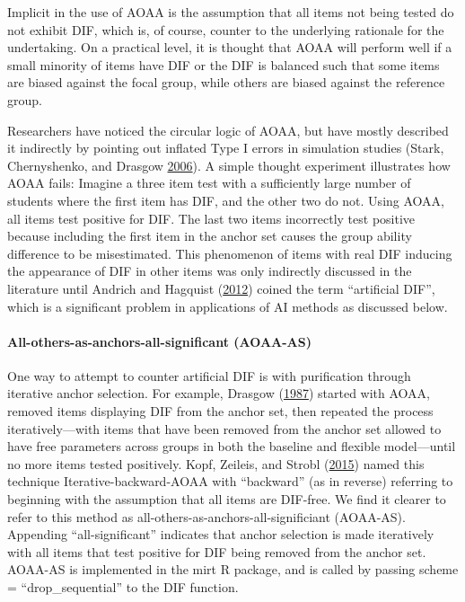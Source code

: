 \documentclass[
  11pt,
]{article}
\begin{document}
Implicit in the use of AOAA is the assumption that all items not being tested do not exhibit DIF, which is, of course, counter to the underlying rationale for the undertaking. On a practical level, it is thought that AOAA will perform well if a small minority of items have DIF or the DIF is balanced such that some items are biased against the focal group, while others are biased against the reference group.

Researchers have noticed the circular logic of AOAA, but have mostly described it indirectly by pointing out inflated Type I errors in simulation studies (Stark, Chernyshenko, and Drasgow \protect\hyperlink{ref-stark2006detecting}{2006}). A simple thought experiment illustrates how AOAA fails: Imagine a three item test with a sufficiently large number of students where the first item has DIF, and the other two do not. Using AOAA, all items test positive for DIF. The last two items incorrectly test positive because including the first item in the anchor set causes the group ability difference to be misestimated. This phenomenon of items with real DIF inducing the appearance of DIF in other items was only indirectly discussed in the literature until Andrich and Hagquist (\protect\hyperlink{ref-andrich2012real}{2012}) coined the term \enquote{artificial DIF}, which is a significant problem in applications of AI methods as discussed below.

\hypertarget{all-others-as-anchors-all-significant-aoaa-as}{%
\paragraph{All-others-as-anchors-all-significant (AOAA-AS)}\label{all-others-as-anchors-all-significant-aoaa-as}}

One way to attempt to counter artificial DIF is with purification through iterative anchor selection. For example, Drasgow (\protect\hyperlink{ref-drasgow1987study}{1987}) started with AOAA, removed items displaying DIF from the anchor set, then repeated the process iteratively---with items that have been removed from the anchor set allowed to have free parameters across groups in both the baseline and flexible model---until no more items tested positively. Kopf, Zeileis, and Strobl (\protect\hyperlink{ref-kopf2015framework}{2015}) named this technique Iterative-backward-AOAA with \enquote{backward} (as in reverse) referring to beginning with the assumption that all items are DIF-free. We find it clearer to refer to this method as all-others-as-anchors-all-significiant (AOAA-AS). Appending \enquote{all-significant} indicates that anchor selection is made iteratively with all items that test positive for DIF being removed from the anchor set. AOAA-AS is implemented in the mirt R package, and is called by passing scheme = \enquote{drop\_sequential} to the DIF function.
\end{document}
